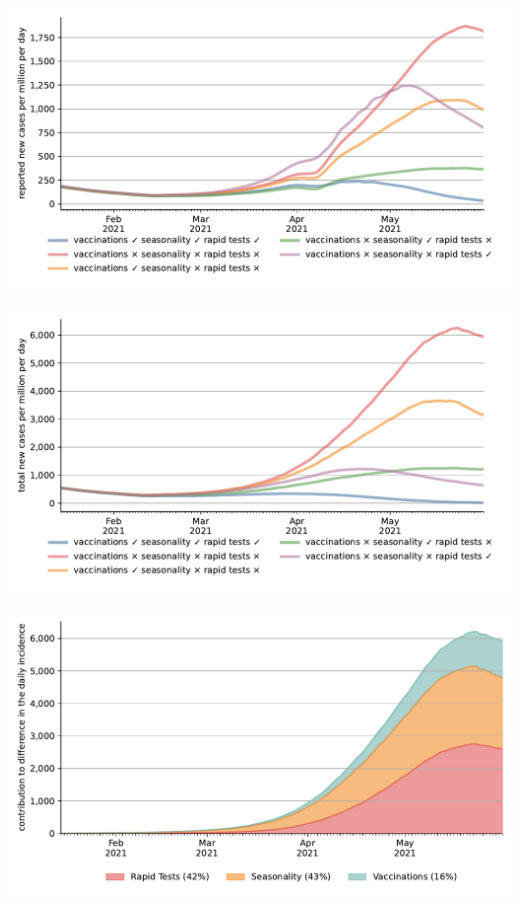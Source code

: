 \documentclass[11pt]{beamer}
\begin{document}
\begin{frame}
    \centering
    \includegraphics[width=\textwidth]{figures/results/figures/scenario_comparisons/effect_of_channels_on_pessimistic_scenario/full_new_known_case}
\end{frame}


\begin{frame}
    \centering
    \includegraphics[width=\textwidth]{figures/results/figures/scenario_comparisons/effect_of_channels_on_pessimistic_scenario/full_newly_infected}
\end{frame}


\begin{frame}
    \centering
    \includegraphics[width=\textwidth]{figures/results/figures/full_decomposition_channels_area}
\end{frame}
\end{document}
